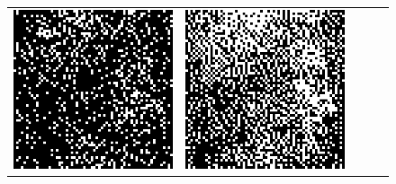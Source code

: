 \begin{figure}
\begin{tabular}{c c c c c}
		\includegraphics[width=\tilewidth,interpolate=false]{media/chp2/associative_memory/hopfield/07_02_activation_scaled_crushed.png}&%
		\includegraphics[width=\tilewidth,interpolate=false]{media/chp2/associative_memory/hopfield/07_03_activation_scaled_crushed.png}&%

\end{tabular}
\end{figure}
